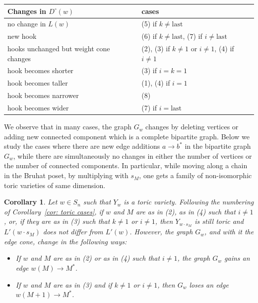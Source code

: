 \documentclass[11pt]{amsart}
\newtheorem{corollary}[theorem]{Corollary}
\theoremstyle{definition}
\theoremstyle{definition}
\theoremstyle{definition}
\theoremstyle{definition}
\newcommand{\Dc}{D^{\circ}}
\begin{document}
\begin{table}[H]
    \centering
    \begin{tabular}{ |l|l| }
    Changes in $\Dc(w)$ & cases \\
    \hline
    no change in $L(w)$ & (5) if $k \neq \mathrm{last}$ \\
    new hook & (6) if $k \neq \mathrm{last}$, (7) if $i \neq \mathrm{last}$ \\
    hooks unchanged but weight cone changes & (2), (3) if $k \neq 1$ or $i \neq 1$, (4) if $i \neq 1$\\
    hook becomes shorter & (3) if $i=k=1$\\
    hook becomes taller & (1), (4) if $i=1$\\
    hook becomes narrower & (8)\\
    hook becomes wider & (7) if $i = \mathrm{last}$ \\
    \end{tabular}
\end{table}

    \noindent We observe that in many cases, the graph $G_w$ changes by deleting vertices or adding new connected component which is a complete bipartite graph. Below we study the cases where there are new edge additions $a \rightarrow b^*$ in the bipartite graph $G_w$, while there are simultaneously no changes in either the number of vertices or the number of connected components. In particular, while moving along a chain in the Bruhat poset, by multiplying with $s_M$, one gets a family of non-isomorphic toric varieties of same dimension. 

\begin{corollary}\label{cor: change of the weight cone}
Let $w\in S_n$ such that $Y_w$ is a toric variety. Following the numbering of Corollary~\ref{cor: toric cases}, if $w$ and $M$ are as in (2), as in (4) such that $i \neq 1$, or, if they are as in (3) such that $k \neq 1$ or $i \neq 1$, then $Y_{w \cdot s_M}$ is still toric and $L'(w\cdot s_M)$ does not differ from $L'(w)$. However, the graph $G_w$, and with it the edge cone, change in the following ways:
\begin{itemize}
    \item If $w$ and $M$ are as in (2) or as in (4) such that $i \neq 1$, the graph $G_w$ gains an edge $w(M) \to M^*$.
    \item If $w$ and $M$ are as in (3) and if $k \neq 1$ or $i \neq 1$, then $G_w$ loses an edge $w(M+1) \to M^*$.
\end{itemize}
\end{corollary}
\end{document}
